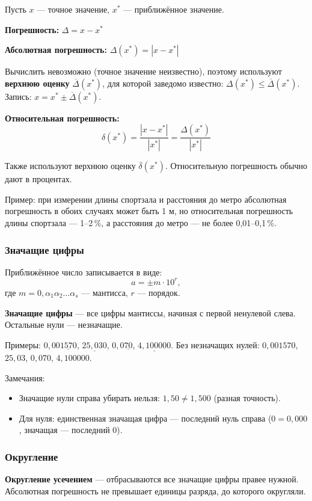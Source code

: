 \documentclass[14pt,a4paper]{extarticle}
\begin{document}
Пусть $x$ --- точное значение, $x^*$ --- приближённое значение.

\textbf{Погрешность:} $\Delta = x - x^*$

\textbf{Абсолютная погрешность:} $\Delta(x^*) = |x - x^*|$

Вычислить невозможно (точное значение неизвестно), поэтому используют \textbf{верхнюю оценку} $\overline{\Delta}(x^*)$, для которой заведомо известно: $\Delta(x^*) \leq \overline{\Delta}(x^*)$. Запись: $x = x^* \pm \overline{\Delta}(x^*)$.

\textbf{Относительная погрешность:}
\[\delta(x^*) = \frac{|x - x^*|}{|x^*|} = \frac{\Delta(x^*)}{|x^*|}\]

Также используют верхнюю оценку $\overline{\delta}(x^*)$. Относительную погрешность обычно дают в процентах.

Пример: при измерении длины спортзала и расстояния до метро абсолютная погрешность в обоих случаях может быть 1 м, но относительная погрешность длины спортзала --- 1--2\,\%, а расстояния до метро --- не более 0,01--0,1\,\%.

\subsubsection{Значащие цифры}

Приближённое число записывается в виде:
\[a = \pm m \cdot 10^r,\]
где $m = 0,\alpha_1\alpha_2\ldots\alpha_s$ --- мантисса, $r$ --- порядок.

\textbf{Значащие цифры} --- все цифры мантиссы, начиная с первой ненулевой слева. Остальные нули --- незначащие.

Примеры: $0{,}00\underline{1570}$, $\underline{25{,}030}$, $0{,}0\underline{70}$, $\underline{4{,}100000}$. Без незначащих нулей: $0{,}001570$, $25{,}03$, $0{,}070$, $4{,}100000$.

Замечания:
\begin{itemize}
    \item Значащие нули справа убирать нельзя: $1{,}50 \neq 1{,}500$ (разная точность).
    \item Для нуля: единственная значащая цифра --- последний нуль справа ($0 = 0{,}000$, значащая --- последний 0).
\end{itemize}

\subsubsection{Округление}

\textbf{Округление усечением} --- отбрасываются все значащие цифры правее нужной. Абсолютная погрешность не превышает единицы разряда, до которого округляли.
\end{document}
